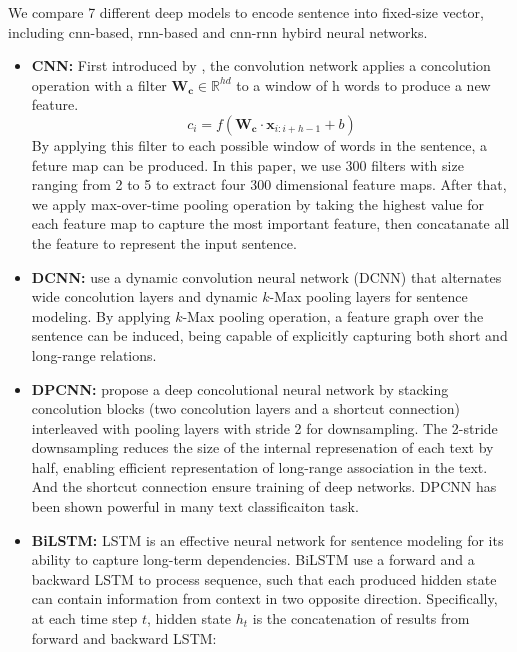 \documentclass[11pt,a4paper]{article}
\begin{document}
We compare 7 different deep models to encode sentence into fixed-size vector, including cnn-based, rnn-based and cnn-rnn hybird neural networks.
\begin{itemize}
        \item \textbf{CNN:} First introduced by \cite{D14-1181}, the convolution network applies a concolution operation with a filter $\mathbf{W_{c}} \in \mathbb{R}^{h d}$ to a window of h words to produce a new feature.
        \begin {equation} 
	 c_{i}=f\left(\mathbf{W_{c}} \cdot \mathbf{x}_{i : i+h-1}+b\right)
 	\end {equation}
By applying this filter to each possible window of words in the sentence, a feture map can be produced. In this paper, we use 300 filters with size ranging from 2 to 5 to extract four 300 dimensional feature maps.  After that, we apply max-over-time pooling operation by taking the highest value for each feature map to capture the most important feature, then concatanate all the feature to represent the input sentence.
        \item \textbf{DCNN:} \cite{P14-1062} use a dynamic convolution neural network (DCNN) that alternates wide concolution layers and dynamic $k$-Max pooling layers for sentence modeling. By applying $k$-Max pooling operation, a feature graph over the sentence can be induced, being capable of explicitly capturing both short and long-range relations.
        \item \textbf{DPCNN:} \cite{P17-1052} propose a deep concolutional neural network by stacking concolution blocks (two concolution layers and a shortcut connection) interleaved with pooling layers with stride 2 for downsampling. The 2-stride downsampling reduces the size of the internal represenation of each text by half, enabling efficient representation of long-range association in the text.  And the shortcut connection ensure training of deep networks. DPCNN has been shown powerful in many text classificaiton task.
        \item \textbf{BiLSTM:} LSTM is an effective neural network for sentence modeling for its ability to capture long-term dependencies. BiLSTM use a forward and a backward LSTM to process sequence, such that each produced hidden state can contain information from context in two opposite direction. Specifically, at each time step $t$, hidden state $h_{t}$ is the concatenation of results from forward and backward LSTM:
\begin{equation}
\begin{aligned}

\end{aligned}
\end{equation}
\end{itemize}
\end{document}
